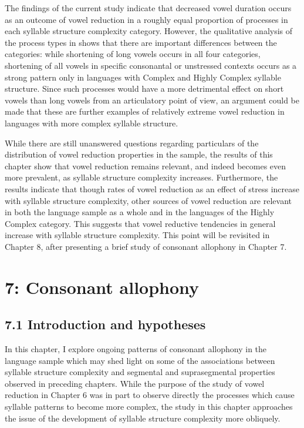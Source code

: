   The findings of the current study indicate that decreased vowel duration occurs as an outcome of vowel reduction in a roughly equal proportion of processes in each syllable structure complexity category. However, the qualitative analysis of the process types in  shows that there are important differences between the categories: while shortening of long vowels occurs in all four categories, shortening of all vowels in specific consonantal or unstressed contexts occurs as a strong pattern only in languages with Complex and Highly Complex syllable structure. Since such processes would have a more detrimental effect on short vowels than long vowels from an articulatory point of view, an argument could be made that these are further examples of relatively extreme vowel reduction in languages with more complex syllable structure.



  While there are still unanswered questions regarding particulars of the distribution of vowel reduction properties in the sample, the results of this chapter show that vowel reduction remains relevant, and indeed becomes even more prevalent, as syllable structure complexity increases. Furthermore, the results indicate that though rates of vowel reduction as an effect of stress increase with syllable structure complexity, other sources of vowel reduction are relevant in both the language sample as a whole and in the languages of the Highly Complex category. This suggests that vowel reductive tendencies in general increase with syllable structure complexity. This point will be revisited in Chapter 8, after presenting a brief study of consonant allophony in Chapter 7.


\chapter{7: Consonant allophony}
\section{7.1 Introduction and hypotheses}

  In this chapter, I explore ongoing patterns of consonant allophony in the language sample which may shed light on some of the associations between syllable structure complexity and segmental and suprasegmental properties observed in preceding chapters. While the purpose of the study of vowel reduction in Chapter 6 was in part to observe directly the processes which cause syllable patterns to become more complex, the study in this chapter approaches the issue of the development of syllable structure complexity more obliquely. 



